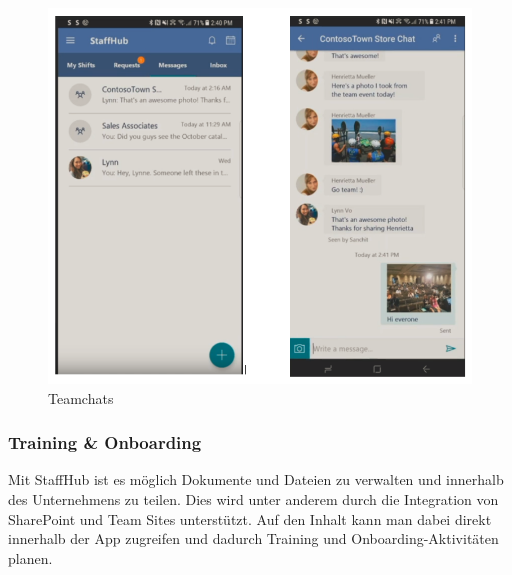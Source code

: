 \begin{figure}[H] 
\centering 
\includegraphics[scale=0.78]{images/groupchat} 
\caption[Teamchats]{Teamchats\protect} 
\label{ws} 
\end{figure}

\subsubsection{Training \& Onboarding}

Mit StaffHub ist es möglich Dokumente und Dateien zu verwalten und innerhalb des Unternehmens zu teilen. Dies wird unter anderem durch die Integration von SharePoint und Team Sites unterstützt. Auf den Inhalt kann man dabei direkt innerhalb der App zugreifen und dadurch Training und Onboarding-Aktivitäten planen.

